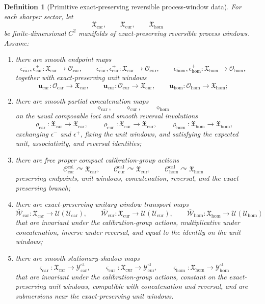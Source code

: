 \documentclass[11pt]{article}
\newcommand{\RootTensorClass}{\mathscr U_{\mathrm{car}}}
\newcommand{\RootRelabelClass}{\mathscr U_{\mathrm{cur}}}
\newcommand{\RootFreeClass}{\mathscr U_{\mathrm{hom}}}
\newcommand{\TensorObjClass}{\mathcal O_{\mathrm{car}}}
\newcommand{\CurObjClass}{\mathcal O_{\mathrm{cur}}}
\newcommand{\HomObjClass}{\mathcal O_{\mathrm{hom}}}
\newcommand{\TensorWindowClass}{\mathfrak X_{\mathrm{car}}}
\newcommand{\CurWindowClass}{\mathfrak X_{\mathrm{cur}}}
\newcommand{\HomWindowClass}{\mathfrak X_{\mathrm{hom}}}
\newcommand{\TensorCalGroup}{\mathcal C_{\mathrm{car}}^{\mathrm{cal}}}
\newcommand{\CurCalGroup}{\mathcal C_{\mathrm{cur}}^{\mathrm{cal}}}
\newcommand{\HomCalGroup}{\mathcal C_{\mathrm{hom}}^{\mathrm{cal}}}
\newcommand{\TensorWindowRep}{\overline{\mathscr W}_{\mathrm{car}}}
\newcommand{\CurWindowRep}{\overline{\mathscr W}_{\mathrm{cur}}}
\newcommand{\HomWindowRep}{\overline{\mathscr W}_{\mathrm{hom}}}
\newcommand{\TensorStatTagClass}{\mathcal Y_{\mathrm{car}}^{\mathrm{st}}}
\newcommand{\CurStatTagClass}{\mathcal Y_{\mathrm{cur}}^{\mathrm{st}}}
\newcommand{\HomStatTagClass}{\mathcal Y_{\mathrm{hom}}^{\mathrm{st}}}
\newcommand{\TensorStatTag}{\varsigma_{\mathrm{car}}}
\newcommand{\CurStatTag}{\varsigma_{\mathrm{cur}}}
\newcommand{\HomStatTag}{\varsigma_{\mathrm{hom}}}
\newtheorem{definition}{Definition}
\begin{document}
\begin{definition}[Primitive exact-preserving reversible process-window data]
\label{def:process_windows}
For each sharper sector, let
\[
\TensorWindowClass,\qquad
\CurWindowClass,\qquad
\HomWindowClass
\]
be finite-dimensional \(C^2\) manifolds of exact-preserving reversible process windows. Assume:
\begin{enumerate}
    \item there are smooth endpoint maps
    \[
    \epsilon_{\mathrm{car}}^{-},\epsilon_{\mathrm{car}}^{+}:\TensorWindowClass\to\TensorObjClass,\qquad
    \epsilon_{\mathrm{cur}}^{-},\epsilon_{\mathrm{cur}}^{+}:\CurWindowClass\to\CurObjClass,\qquad
    \epsilon_{\mathrm{hom}}^{-},\epsilon_{\mathrm{hom}}^{+}:\HomWindowClass\to\HomObjClass,
    \]
    together with exact-preserving unit windows
    \[
    \mathbf u_{\mathrm{car}}:\TensorObjClass\to\TensorWindowClass,\qquad
    \mathbf u_{\mathrm{cur}}:\CurObjClass\to\CurWindowClass,\qquad
    \mathbf u_{\mathrm{hom}}:\HomObjClass\to\HomWindowClass;
    \]
    \item there are smooth partial concatenation maps
    \[
    \diamond_{\mathrm{car}},\qquad
    \diamond_{\mathrm{cur}},\qquad
    \diamond_{\mathrm{hom}}
    \]
    on the usual composable loci and smooth reversal involutions
    \[
    \varrho_{\mathrm{car}}:\TensorWindowClass\to\TensorWindowClass,\qquad
    \varrho_{\mathrm{cur}}:\CurWindowClass\to\CurWindowClass,\qquad
    \varrho_{\mathrm{hom}}:\HomWindowClass\to\HomWindowClass,
    \]
    exchanging \(\epsilon^{-}\) and \(\epsilon^{+}\), fixing the unit windows, and satisfying the expected unit, associativity, and reversal identities;
    \item there are free proper compact calibration-group actions
    \[
    \TensorCalGroup\curvearrowright\TensorWindowClass,\qquad
    \CurCalGroup\curvearrowright\CurWindowClass,\qquad
    \HomCalGroup\curvearrowright\HomWindowClass
    \]
    preserving endpoints, unit windows, concatenation, reversal, and the exact-preserving branch;
    \item there are exact-preserving unitary window transport maps
    \[
    \TensorWindowRep:\TensorWindowClass\to\mathcal U(\RootTensorClass),\qquad
    \CurWindowRep:\CurWindowClass\to\mathcal U(\RootRelabelClass),\qquad
    \HomWindowRep:\HomWindowClass\to\mathcal U(\RootFreeClass)
    \]
    that are invariant under the calibration-group actions, multiplicative under concatenation, inverse under reversal, and equal to the identity on the unit windows;
    \item there are smooth stationary-shadow maps
    \[
    \TensorStatTag:\TensorWindowClass\to\TensorStatTagClass,\qquad
    \CurStatTag:\CurWindowClass\to\CurStatTagClass,\qquad
    \HomStatTag:\HomWindowClass\to\HomStatTagClass
    \]
    that are invariant under the calibration-group actions, constant on the exact-preserving unit windows, compatible with concatenation and reversal, and are submersions near the exact-preserving unit windows.
\end{enumerate}


\end{definition}
\end{document}
